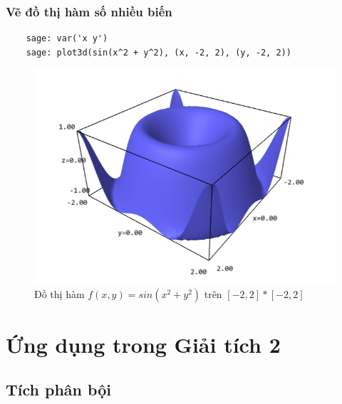 \subsubsection{Vẽ đồ thị hàm số nhiều biến}
\begin{lstlisting}
	sage: var('x y')
	sage: plot3d(sin(x^2 + y^2), (x, -2, 2), (y, -2, 2))
\end{lstlisting}
\begin{figure}[H]
	\centering
	\includegraphics[width=0.7\linewidth]{images/5134}
	\caption{Đồ thị hàm $f(x,y)=sin(x^2+y^2)$ trên $\left[-2,2\right]*\left[-2,2\right]$}
	\label{fig:5134}
\end{figure}

\section{Ứng dụng trong Giải tích 2}

\subsection{Tích phân bội}

